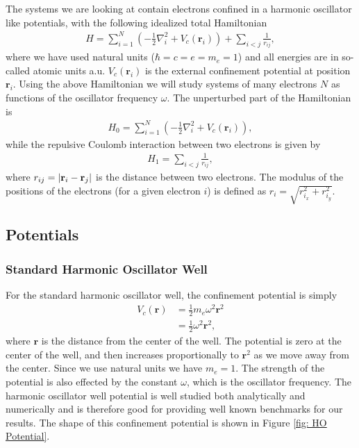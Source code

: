 \documentclass[../main.tex]{subfiles}
\begin{document}
The systems we are looking at contain electrons confined in a harmonic oscillator like potentials, with the following idealized total Hamiltonian
\begin{align}\label{eq: finalH}
    H=\sum_{i=1}^{N} \left(  -\frac{1}{2} \nabla_i^2 + V_c(\mathbf{r}_i)  \right)+\sum_{i<j}\frac{1}{r_{ij}},
\end{align}
where we have used natural units ($\hbar=c=e=m_e=1$) and all energies are in so-called atomic units a.u. $V_c(\mathbf{r}_i)$ is the external confinement potential at position $\mathbf{r}_i$. Using the above Hamiltonian we will study systems of many electrons $N$ as functions of the oscillator frequency  $\omega$. The unperturbed part of the Hamiltonian is
\begin{align}
    H_0=\sum_{i=1}^{N} \left(  -\frac{1}{2} \nabla_i^2 + V_c(\mathbf{r}_i)  \right),
\end{align}
while the repulsive Coulomb interaction between two electrons is given by
\begin{align}
    H_1=\sum_{i<j}\frac{1}{r_{ij}},
\end{align}
where $r_{ij}=\vert {\bf r}_i-{\bf r}_j\vert$ is the distance between two electrons. The modulus of the positions of the electrons (for a given electron $i$) is defined as $r_i = \sqrt{r_{i_x}^2+r_{i_y}^2}$.



\subsection{Potentials}

\subsubsection{Standard Harmonic Oscillator Well}

For the standard harmonic oscillator well, the confinement potential is simply
\begin{equation}\label{eq: HO Potential}
\begin{split}
    V_c(\mathbf{r}) &= \frac{1}{2}m_e\omega^2 \mathbf{r}^2\\
    &=\frac{1}{2}\omega^2 \mathbf{r}^2,
\end{split}
\end{equation}
where $\mathbf{r}$ is the distance from the center of the well. The potential is zero at the center of the well, and then increases proportionally to $\mathbf{r}^2$ as we move away from the center. Since we use natural units we have $m_e=1$. The strength of the potential is also effected by the constant $\omega$, which is the oscillator frequency. The harmonic oscillator well potential is well studied both analytically and numerically and is therefore good for providing well known benchmarks for our results. The shape of this confinement potential is shown in Figure \ref{fig: HO Potential}.
\end{document}

